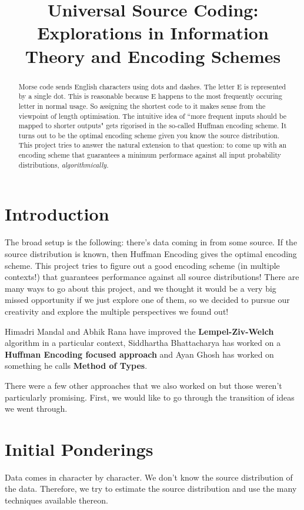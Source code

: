 \documentclass[scrartcl]{article}
\date{}
\author{}
\title{Universal Source Coding: Explorations in Information Theory and Encoding Schemes}
\begin{document}

\pagestyle{fancy}
\maketitle
\author{}
\date{}
\begin{abstract}
    Morse code sends English characters using dots and dashes. The letter E is represented by a single dot. This is reasonable because E happens to the most frequently occuring letter in normal usage. So assigning the shortest code to it makes sense from the viewpoint of length optimisation. 
    The intuitive idea of ``more frequent inputs should be mapped to shorter outputs" gets rigorised in the so-called Huffman encoding scheme. It turns out to be the optimal encoding scheme given you know the source distribution. This project tries to answer the natural extension to that question: to come up with an encoding scheme that guarantees a minimum performace against all input probability distributions, \textit{algorithmically.}
\end{abstract}
\section{Introduction}
The broad setup is the following: there's data coming in from some source. If the source distribution is known, then Huffman Encoding gives the optimal encoding scheme. This project tries to figure out a good encoding scheme (in multiple contexts!) that guarantees performance against all source distributions!
There are many ways to go about this project, and we thought it would be a very big missed opportunity if we just explore one of them, so we decided to pursue our creativity and explore the multiple perspectives we found out!

Himadri Mandal and Abhik Rana have improved the \textbf{Lempel-Ziv-Welch} algorithm in a particular context, Siddhartha Bhattacharya has worked on a \textbf{Huffman Encoding focused approach} and Ayan Ghosh has worked on something he calls \textbf{Method of Types}. 

There were a few other approaches that we also worked on but those weren't particularly promising. First, we would like to go through the transition of ideas we went through. 

\section {Initial Ponderings}
\begin{context}
Data comes in character by character. We don't know the source distribution of the data. Therefore, we try to estimate the source distribution and use the many techniques available thereon.
\end{context}
\end{document}
